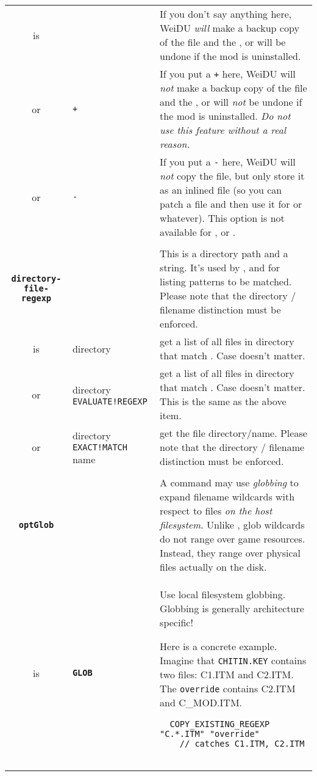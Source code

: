 \documentclass{article}
\def\ttref#1{\ahrefloc{#1}{\tt #1}}
\def\DEFINE#1{{\tt \bf #1}\label{#1}\index{#1}}
\def\t#1{{\tt #1}}
\begin{document}
\begin{tabular}{cp{10in}|p{10in}}
  is &   & If you don't say anything here, WeiDU {\em will} make a backup
           copy of the file and the \ttref{COPY}, \ttref{MOVE} or \ttref{DELETE} will be undone if the mod
           is uninstalled. \\
  or & \t{+} & If you put a \t{+} here, WeiDU will {\em not} make a backup
           copy of the file and the \ttref{COPY}, \ttref{MOVE} or \ttref{DELETE} will {\em not} be
           undone if the mod is uninstalled. {\em Do not use this feature without
			a real reason.} \\
  or & \t{-} & If you put a \t{-} here, WeiDU will {\em not} copy the file,
           but only store it as an inlined file (so you can patch a file and
           then use it for \ttref{EXTEND!BOTTOM} or whatever).
           This option is not available for \ttref{COPY!LARGE}, \ttref{MOVE} or \ttref{DELETE}. \\
\\

\DEFINE{directory-file-regexp} & & This is a directory path and a \ttref{regexp} string.
It's used by \ttref{MAKE!BIFF}, \ttref{ACTION!BASH!FOR} and \ttref{PATCH!BASH!FOR}
for listing patterns to be matched. Please note that
the directory / filename distinction must be enforced. \\
is & directory \ttref{regexp} & get a list of all files in directory that match \ttref{regexp}.
Case doesn't matter. \\
or & directory \t{EVALUATE!REGEXP} \ttref{regexp} & get a list of all files in directory that match \ttref{regexp}.
Case doesn't matter. This is the same as the above item. \\
or & directory \t{EXACT!MATCH} name & get the file directory/name. Please note that
the directory / filename distinction must be enforced. \\

\\
\DEFINE{optGlob} & &
  A \ttref{COPY} command may use \emph{globbing} to expand filename
  wildcards with respect to files \emph{on the host filesystem}. Unlike
  \ttref{COPY!EXISTING!REGEXP}, glob wildcards do not range over game
  resources. Instead, they range over physical files actually on the disk.
  \\
  is & \DEFINE{GLOB} & Use local filesystem globbing. Globbing is
  generally architecture specific!

  Here is a concrete example. Imagine that \t{CHITIN.KEY} contains
  two files: C1.ITM and C2.ITM. The \t{override} contains C2.ITM and
  C\_MOD.ITM.
\begin{verbatim}
  COPY_EXISTING_REGEXP "C.*.ITM" "override"
    // catches C1.ITM, C2.ITM


\end{verbatim}
\end{tabular}
\end{document}
